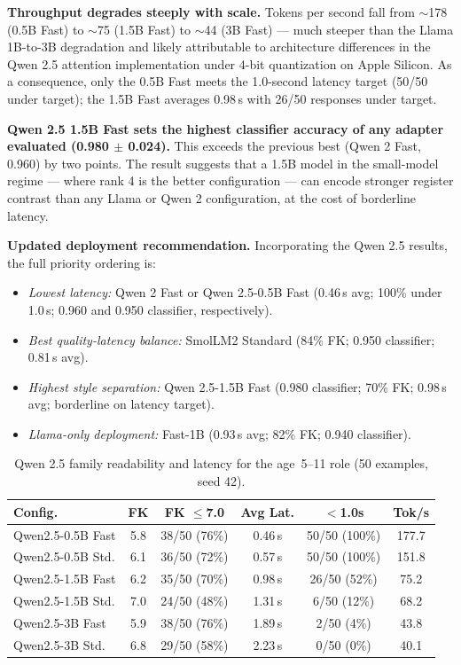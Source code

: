 \documentclass[journal]{IEEEtai}
\begin{document}
\textbf{Throughput degrades steeply with scale.} Tokens per second fall from $\sim$178 (0.5B Fast) to $\sim$75 (1.5B Fast) to $\sim$44 (3B Fast) --- much steeper than the Llama 1B-to-3B degradation and likely attributable to architecture differences in the Qwen 2.5 attention implementation under 4-bit quantization on Apple Silicon. As a consequence, only the 0.5B Fast meets the 1.0-second latency target (50/50 under target); the 1.5B Fast averages 0.98\,s with 26/50 responses under target.

\textbf{Qwen 2.5 1.5B Fast sets the highest classifier accuracy of any adapter evaluated (0.980 $\pm$ 0.024).} This exceeds the previous best (Qwen 2 Fast, 0.960) by two points. The result suggests that a 1.5B model in the small-model regime --- where rank 4 is the better configuration --- can encode stronger register contrast than any Llama or Qwen 2 configuration, at the cost of borderline latency.

\textbf{Updated deployment recommendation.} Incorporating the Qwen 2.5 results, the full priority ordering is:
\begin{itemize}
    \item \textit{Lowest latency:} Qwen 2 Fast or Qwen 2.5-0.5B Fast (0.46\,s avg; 100\% under 1.0\,s; 0.960 and 0.950 classifier, respectively).
    \item \textit{Best quality-latency balance:} SmolLM2 Standard (84\% FK; 0.950 classifier; 0.81\,s avg).
    \item \textit{Highest style separation:} Qwen 2.5-1.5B Fast (0.980 classifier; 70\% FK; 0.98\,s avg; borderline on latency target).
    \item \textit{Llama-only deployment:} Fast-1B (0.93\,s avg; 82\% FK; 0.940 classifier).
\end{itemize}

\begin{table}[!t]
  \centering
  \caption{Qwen 2.5 family readability and latency for the age~5--11 role (50 examples, seed 42).}
  \label{tab:qwen25}
  \small
  \begin{tabular}{lccccc}
    \hline
    Config. & FK & FK $\leq$7.0 & Avg Lat. & $<$1.0s & Tok/s \\
    \hline
    Qwen2.5-0.5B Fast & 5.8 & 38/50 (76\%) & 0.46\,s & 50/50 (100\%) & 177.7 \\
    Qwen2.5-0.5B Std. & 6.1 & 36/50 (72\%) & 0.57\,s & 50/50 (100\%) & 151.8 \\
    Qwen2.5-1.5B Fast & 6.2 & 35/50 (70\%) & 0.98\,s & 26/50 (52\%)  & 75.2  \\
    Qwen2.5-1.5B Std. & 7.0 & 24/50 (48\%) & 1.31\,s & 6/50 (12\%)   & 68.2  \\
    Qwen2.5-3B Fast   & 5.9 & 38/50 (76\%) & 1.89\,s & 2/50 (4\%)    & 43.8  \\
    Qwen2.5-3B Std.   & 6.8 & 29/50 (58\%) & 2.23\,s & 0/50 (0\%)    & 40.1  \\
    \hline
  \end{tabular}
\end{table}
\end{document}

